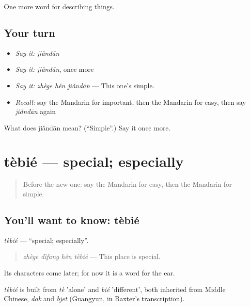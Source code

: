 \begin{grammarlens}[title={What you've built}]
One more word for describing things.
\end{grammarlens}

\subsection*{Your turn}
\begin{itemize}
\raggedright
  \item \emph{Say it:} \emph{jiǎndān}
  \item \emph{Say it:} \emph{jiǎndān}, once more
  \item \emph{Say it:} \emph{zhège hěn jiǎndān} — This one's simple.
  \item \emph{Recall:} say the Mandarin for important, then the Mandarin for easy, then say \emph{jiǎndān} again
\end{itemize}

\begin{tcolorbox}[breakable,colback=teal!4,colframe=teal!35!black,title={Before you move on}]
What does jiǎndān mean? (\textquotedblleft{}Simple\textquotedblright{}.) Say it once more.
\end{tcolorbox}
\section[tèbié]{tèbié — special; especially}

\label{lesson:ZH-C144-tebie}



\begin{quote}
Before the new one: say the Mandarin for easy, then the Mandarin for simple.
\end{quote}

\subsection*{You'll want to know: tèbié}
\emph{tèbié} — \textquotedblleft{}special; especially\textquotedblright{}.

\begin{quote}
\emph{zhège dìfang hěn tèbié} — This place is special.
\end{quote}

Its characters come later; for now it is a word for the ear.

\begin{cousinweb}
\emph{tèbié} is built from \emph{tè} 'alone' and \emph{bié} 'different', both inherited from Middle Chinese, \emph{dok} and \emph{bjet} (Guangyun, in Baxter's transcription).
\end{cousinweb}

